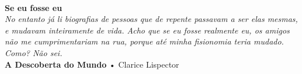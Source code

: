 \vfill

\begin{importantbox}
\raggedleft
{ \\
\vspace{1em}
\textbf{Se eu fosse eu} \\
\textit{No entanto já li biografias de pessoas que de repente passavam a ser elas mesmas, e mudavam inteiramente de vida. Acho que se eu fosse realmente eu, os amigos não me cumprimentariam na rua, porque até minha fisionomia teria mudado. Como? Não sei.}} \\
\textbf{A Descoberta do Mundo} • Clarice Lispector
\end{importantbox}